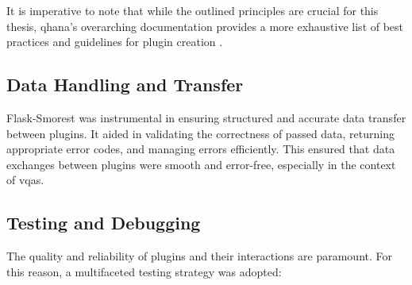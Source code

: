 \documentclass[
  a4paper,  %
  twoside,  %
  bibliography=totoc,
  headsepline,
  cleardoublepage=empty,
  parskip=half,
  draft=false
]{scrbook}
\begin{document}
It is imperative to note that while the outlined principles are crucial for this thesis, \gls{qhana}'s overarching documentation provides a more exhaustive list of best practices and guidelines for plugin creation \cite{FabianBuehler}.


\subsection{Data Handling and Transfer}
Flask-Smorest was instrumental in ensuring structured and accurate data transfer between plugins.
It aided in validating the correctness of passed data, returning appropriate error codes, and managing errors efficiently.
This ensured that data exchanges between plugins were smooth and error-free, especially in the context of \glspl{vqa}.

\subsection{Testing and Debugging}

The quality and reliability of plugins and their interactions are paramount.
For this reason, a multifaceted testing strategy was adopted:
\end{document}
